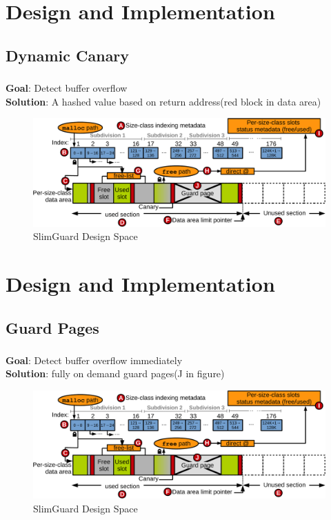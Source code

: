 \documentclass{beamer}
\begin{document}
\section{Design and Implementation}
\subsection{Dynamic Canary}
\begin{frame}
    \frametitle{\secname}
    \framesubtitle{\subsecname}
    \textbf{Goal}: Detect buffer overflow \\
    \textbf{Solution}: A hashed value based on return address(red block in data area)
    \begin{figure}
      \centering
      \includegraphics[scale=0.35]{overview3.pdf}
      \\ SlimGuard Design Space
    \end{figure}
\end{frame}

\section{Design and Implementation}
\subsection{Guard Pages}
\begin{frame}
    \frametitle{\secname}
    \framesubtitle{\subsecname}
    \textbf{Goal}: Detect buffer overflow immediately \\
    \textbf{Solution}: fully on demand guard pages(J in figure)
    \begin{figure}
      \centering
      \includegraphics[scale=0.35]{overview3.pdf}
      \\ SlimGuard Design Space
    \end{figure}
\end{frame}
\end{document}
